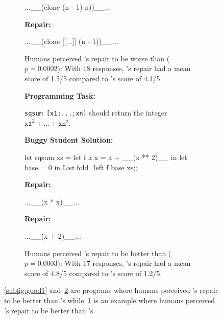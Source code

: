 \begin{figure}
\begin{subfigure}[t]{.28\textwidth}
\begin{compactcode}
 ...__(clone (n - 1) n))__...
\end{compactcode}
\begin{center}
\textbf{\seminal Repair:}
\end{center}
\begin{compactcode}
...__(clone [[...]] (n - 1))__...
\end{compactcode}
\caption{Humans perceived \toolname's repair to be
worse than \seminal ($p=0.0002$): With 18 responses, \toolname's
repair had a mean score of 1.5/5 compared to \seminal's
score of 4.1/5.}
\label{subfig:bad}
\end{subfigure}\hfill
\begin{subfigure}[t]{.1\textwidth}
\end{subfigure}\hfill
\begin{subfigure}[t]{.28\textwidth}
\begin{center}
\textbf{Programming Task:}
\end{center} 
\texttt{sqsum [x1;...;xn]} should return the 
integer $\texttt{x1}^2 + ... + \texttt{xn}^2$.
\begin{center}
\textbf{Buggy Student Solution:}
\end{center}
\begin{compactcode}
let sqsum xs = 
let f a x = a + __(x ** 2)__ in
let base = 0 in
List.fold_left f base xs;;
\end{compactcode}
\begin{center}
\textbf{\toolname Repair:}
\end{center}
\begin{compactcode}
       ...__(x * x)__...
\end{compactcode}
\begin{center}
\textbf{\seminal Repair:}
\end{center}
\begin{compactcode}
      ...__(x + 2)__...
\end{compactcode}
\caption{Humans perceived \toolname's repair to be
better than \seminal ($p=0.0003$): With 17 responses, \toolname's
repair had a mean score of 4.8/5 compared to \seminal's
score of 1.2/5.}
\label{subfig:good2}
\end{subfigure}
\caption{\ref{subfig:good1} and~\ref{subfig:good2} are programs where
humans perceived \toolname's repair to be better than \seminal's while~\ref{subfig:bad}
is an example where humans perceived \seminal's repair to be better than \toolname's.}
\label{fig:examples}
\end{figure}

